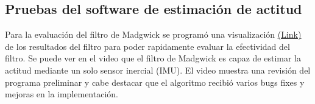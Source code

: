 \subsection{Pruebas del software de estimación de actitud}
Para la evaluación del filtro de Madgwick se programó una visualización \href{https://www.youtube.com/watch?v=M0_s6UW86cs&ab_channel=PatricioWhittingslow}{(Link)} de los resultados del filtro para poder rapidamente evaluar la efectividad del filtro. Se puede ver en el video que el filtro de Madgwick es capaz de estimar la actitud mediante un solo sensor inercial (IMU). El video muestra una revisión del programa preliminar y cabe destacar que el algoritmo recibió varios bugs fixes y mejoras en la implementación. 



